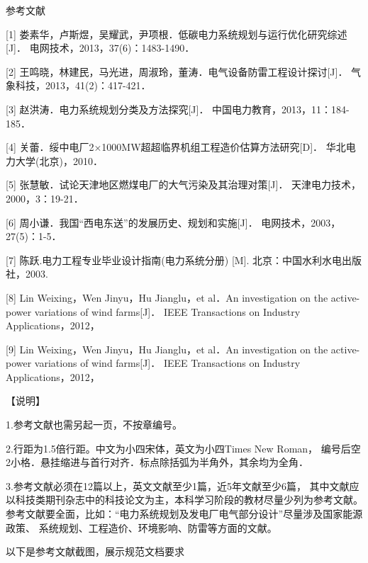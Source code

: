 

参考文献 

[1]  娄素华，卢斯煜，吴耀武，尹项根．低碳电力系统规划与运行优化研究综述[J]．
     电网技术，2013，37(6)：1483-1490．

[2]  王鸣晓，林建民，马光进，周淑玲，董涛．电气设备防雷工程设计探讨[J]．
     气象科技，2013，41(2)：417-421．

[3]  赵洪涛．电力系统规划分类及方法探究[J]．
     中国电力教育，2013，11：184-185．

[4]  关蕾．绥中电厂2×1000MW超超临界机组工程造价估算方法研究[D]．
     华北电力大学(北京)，2010．

[5]  张慧敏．试论天津地区燃煤电厂的大气污染及其治理对策[J]．
     天津电力技术，2000，3：19-21． 

[6]  周小谦．我国“西电东送”的发展历史、规划和实施[J]．
     电网技术，2003，27(5)：1-5．

[7]  陈跃.电力工程专业毕业设计指南(电力系统分册) [M].
     北京：中国水利水电出版社，2003.

[8]  Lin Weixing，Wen Jinyu，Hu Jianglu，et al．An investigation on the active-power variations of wind farms[J]．
     IEEE Transactions on Industry Applications，2012，

[9]  Lin Weixing，Wen Jinyu，Hu Jianglu，et al．An investigation on the active-power variations of wind farms[J]．
     IEEE Transactions on Industry Applications，2012，

     【说明】

     1.参考文献也需另起一页，不按章编号。

     2.行距为1.5倍行距。中文为小四宋体，英文为小四Times New Roman，
     编号后空2小格．悬挂缩进与首行对齐．标点除括弧为半角外，其余均为全角．
     
     3.参考文献必须在12篇以上，英文文献至少1篇，近5年文献至少6篇，
     其中文献应以科技类期刊杂志中的科技论文为主，本科学习阶段的教材尽量少列为参考文献。
     参考文献要全面，比如：“电力系统规划及发电厂电气部分设计”尽量涉及国家能源政策、
     系统规划、工程造价、环境影响、防雷等方面的文献。
     

以下是参考文献截图，展示规范文档要求


